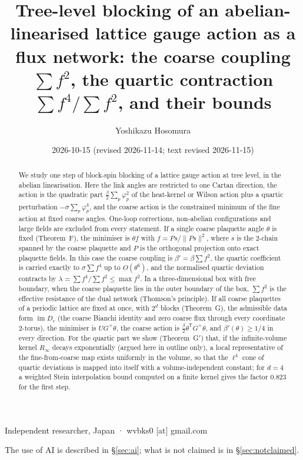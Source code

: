 \documentclass[11pt,a4paper]{article}
\title{Tree-level blocking of an abelian-linearised lattice gauge action as a flux network: the coarse coupling $\sum f^2$, the quartic contraction $\sum f^4/\sum f^2$, and their bounds}
\author{Yoshikazu Hosomura}
\date{2026-10-15 (revised 2026-11-14; text revised 2026-11-15)}
\theoremstyle{definition}
\theoremstyle{remark}
\newcommand{\im}{\operatorname{im}}
\begin{document}
\maketitle
\begin{center}\small Independent researcher, Japan · wvbks0 [at] gmail.com\end{center}
\begin{center}\small The use of AI is described in \S\ref{sec:ai}; what is not claimed is in \S\ref{sec:notclaimed}.\end{center}

\begin{abstract}
We study one step of block-spin blocking of a lattice gauge action at tree level, in the abelian linearisation.
Here the link angles are restricted to one Cartan direction, the action is the quadratic part $\frac{\beta}{2}\sum_p\varphi_p^2$ of the heat-kernel or Wilson action plus a quartic perturbation $-\sigma\sum_p\varphi_p^4$, and the coarse action is the constrained minimum of the fine action at fixed coarse angles.
One-loop corrections, non-abelian configurations and large fields are excluded from every statement.
If a single coarse plaquette angle $\theta$ is fixed (Theorem~F), the minimiser is $\theta f$ with $f=Ps/\|Ps\|^2$, where $s$ is the $2$-chain spanned by the coarse plaquette and $P$ is the orthogonal projection onto exact plaquette fields.
In this case the coarse coupling is $\beta'=\beta\sum f^2$, the quartic coefficient is carried exactly to $\sigma\sum f^4$ up to $O(\theta^6)$, and the normalised quartic deviation contracts by $\lambda=\sum f^4/\sum f^2\le\max f^2$.
In a three-dimensional box with free boundary, when the coarse plaquette lies in the outer boundary of the box, $\sum f^2$ is the effective resistance of the dual network (Thomson's principle).
If all coarse plaquettes of a periodic lattice are fixed at once, with $2^d$ blocks (Theorem~G), the admissible data form $\im D_c$ (the coarse Bianchi identity and zero coarse flux through every coordinate $2$-torus), the minimiser is $UG^{+}\theta$, the coarse action is $\frac\beta2\theta^{\mathsf T}G^{+}\theta$, and $\beta'(\theta)\ge 1/4$ in every direction.
For the quartic part we show (Theorem~G$'$) that, if the infinite-volume kernel $R_\infty$ decays exponentially (argued here in outline only), a local representative of the fine-from-coarse map exists uniformly in the volume, so that the $\ell^4$ cone of quartic deviations is mapped into itself with a volume-independent constant; for $d=4$ a weighted Stein interpolation bound computed on a finite kernel gives the factor $0.823$ for the first step.

\end{abstract}
\end{document}
